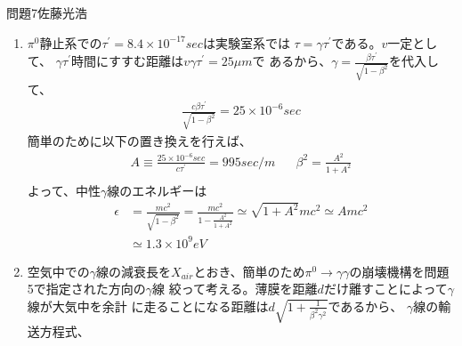\documentclass[fleqn]{jbook}
\begin{document}
\begin{answer}{問題7}{佐藤光浩}
\begin{enumerate}
$\gamma_{2}$について同様に計算すれば、$y$成分が反転した結果を得る。
\begin{eqnarray}
 \mathbf{P_{\gamma_{1}}} 
= \left[\begin{array}{c} \frac{m_{{\pi}_0}\gamma c}{2} \\
 \frac{m_{{\pi}_0}\gamma \beta c}{2} \\ \frac{m_{{\pi}_0}c}{2} \\
 0\end{array}
 \right] \hspace{20pt} \mathbf{P_{\gamma_{2}}}
 = \left[\begin{array}{c} \frac{m_{{\pi}_0}\gamma c}{2} \\
 \frac{m_{{\pi}_0}\gamma \beta c}{2} \\ -\frac{m_{{\pi}_0}c}{2} \\
 0\end{array} \right]
\end{eqnarray}

$\gamma$線が$x$軸となす角度は$\tan \theta = \frac{|v_y|}{|v_x|} =
\frac{1}{\gamma \beta}$より、$\theta= \tan^{-1}\left(\frac{1}{\gamma
\beta}\right)$である。

    \item
$\pi^{0}$静止系での$\tau^{\prime}=8.4\times10^{-17}sec$は実験室系では
$\tau = \gamma \tau^{\prime}$である。$v$一定として、
$\gamma\tau^{\prime}$時間にすすむ距離は$v\gamma\tau^{\prime}=25\mu m$で
あるから、$\gamma=\frac{\beta \tau^{\prime}}{\sqrt{1-\beta^2}}$を代入し
て、
\begin{eqnarray*}
 \frac{c\beta \tau^{\prime}}{\sqrt{1-\beta^2}} = 25 \times 10^{-6} sec
\end{eqnarray*}
簡単のために以下の置き換えを行えば、
\begin{eqnarray*}
 A \equiv \frac{25 \times 10^{-6}sec}{c \tau^{\prime}} = 995 sec/m 
 \hspace{20pt}
 \beta^2 = \frac{A^2}{1+A^2} \\
\end{eqnarray*}
よって、中性$\gamma$線のエネルギーは
\begin{eqnarray}
 \epsilon &= \frac{mc^2}{\sqrt{1-\beta^2}} = \frac{mc^2}{1 -
 \frac{A^2}{1+A^2}}
 \simeq \sqrt{1+A^2}mc^2 \simeq Amc^2 \\
 &\simeq 1.3 \times 10^9 eV
\end{eqnarray}

    \item
 空気中での$\gamma$線の減衰長を$X_{air}$とおき、簡単のため$\pi^0
\rightarrow \gamma \gamma$の崩壊機構を問題5で指定された方向の$\gamma$線
絞って考える。薄膜を距離$d$だけ離すことによって$\gamma$線が大気中を余計
に走ることになる距離は$d\sqrt{1+\frac{1}{\beta^2\gamma^2}}$であるから、
$\gamma$線の輸送方程式、


\end{enumerate}
\end{answer}
\end{document}
